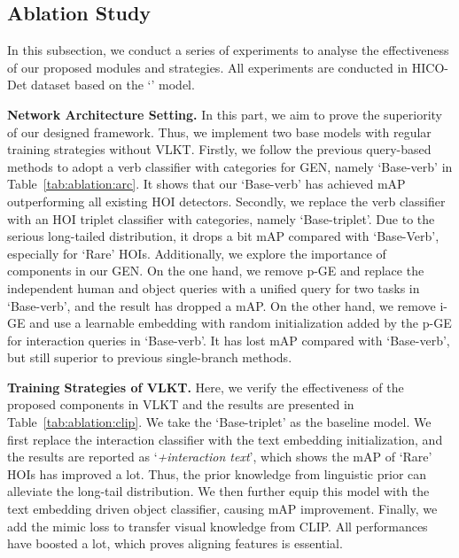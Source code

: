 \documentclass[10pt,twocolumn,letterpaper]{article}
\begin{document}
\vspace{-1.5mm}\subsection{Ablation Study}\label{sec:ablation}\vspace{-1.5mm}
In this subsection, we conduct a series of experiments to analyse the effectiveness of our proposed modules and strategies. All experiments are conducted in HICO-Det dataset based on the `' model.

\vspace{0.5mm}\noindent\textbf{Network Architecture Setting.} In this part, we aim to prove the superiority of our designed framework. Thus, we implement two base models with regular training strategies without VLKT. Firstly, we follow the previous query-based methods to adopt a verb classifier with  categories for GEN, namely `Base-verb' in Table~\ref{tab:ablation:arc}. It shows that our `Base-verb' has achieved  mAP outperforming all existing HOI detectors. Secondly, we replace the verb classifier with an HOI triplet classifier with  categories, namely `Base-triplet'. Due to the serious long-tailed distribution, it drops a bit mAP compared with `Base-Verb', especially for `Rare' HOIs.
Additionally, we explore the importance of components in our GEN. On the one hand, we remove p-GE and replace the independent human and object queries with a unified query for two tasks in `Base-verb', and the result has dropped a  mAP. On the other hand, we remove i-GE and use a learnable embedding with random initialization added by the p-GE for interaction queries in `Base-verb'. It has lost  mAP compared with `Base-verb', but still superior to previous single-branch methods. 

\vspace{0.5mm}\noindent\textbf{Training Strategies of VLKT.} Here, we verify the effectiveness of the proposed components in VLKT and the results are presented in Table~\ref{tab:ablation:clip}. We take the `Base-triplet' as the baseline model. We first replace the interaction classifier with the text embedding initialization, and the results are reported as `\emph{+interaction text}', which shows the mAP of `Rare' HOIs has improved a lot. Thus, the prior knowledge from linguistic prior can alleviate the long-tail distribution.
We then further equip this model with the text embedding driven object classifier, causing  mAP improvement. Finally, we add the mimic loss to transfer visual knowledge from CLIP. All performances have boosted a lot, which proves aligning features is essential. 
\end{document}

